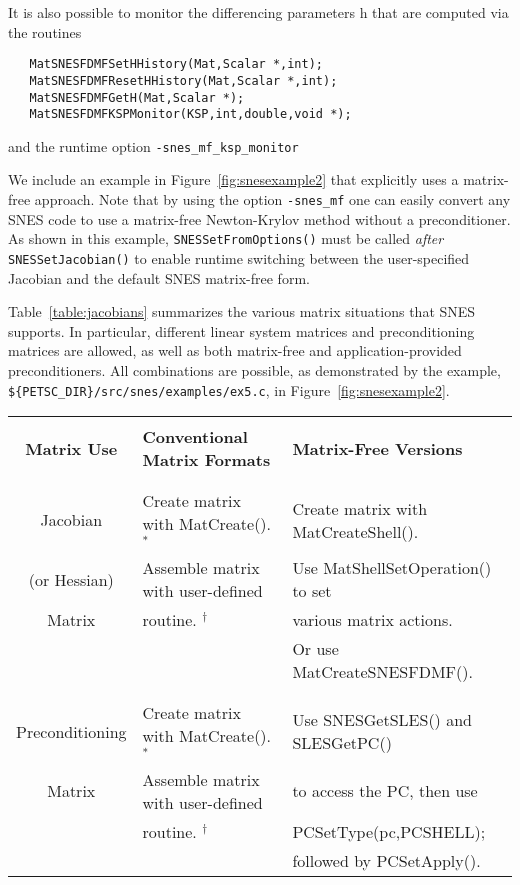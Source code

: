 It is also possible to monitor the differencing parameters h that are computed
via the routines
\begin{verbatim}
   MatSNESFDMFSetHHistory(Mat,Scalar *,int);
   MatSNESFDMFResetHHistory(Mat,Scalar *,int);
   MatSNESFDMFGetH(Mat,Scalar *);
   MatSNESFDMFKSPMonitor(KSP,int,double,void *);
\end{verbatim}
and the runtime option  {\tt -snes\_mf\_ksp\_monitor} {

We include an example in Figure~\ref{fig:snesexample2} that explicitly
uses a matrix-free approach.  Note that by using the option 
{\tt -snes\_mf} one can easily convert any SNES code to use a matrix-free
Newton-Krylov method without a preconditioner.  As shown in this
example, {\tt SNESSetFromOptions()} must be called {\em after}
{\tt SNESSetJacobian()} to enable runtime switching between the
user-specified Jacobian and the default SNES matrix-free form.

Table~\ref{table:jacobians} summarizes the various matrix situations
that SNES supports.  In particular, different linear system matrices
and preconditioning matrices are allowed, as well as both matrix-free
and application-provided preconditioners.  All combinations are
possible, as demonstrated by the example, 
{\tt \$\{PETSC\_DIR\}/src/snes/\-examples/ex5.c},
 in Figure~\ref{fig:snesexample2}.

\begin{center}
\begin{table}[H]
\begin{tabular}{|c|l|l|} \hline
& & \\
{\bf Matrix Use}      & {\bf Conventional Matrix Formats}          & {\bf Matrix-Free Versions}\\ 
& & \\ \hline
& & \\
Jacobian        & Create matrix with MatCreate(). $ ^* $ & Create matrix with MatCreateShell().\\
(or Hessian)    & Assemble matrix with user-defined     & Use MatShellSetOperation() to set\\
Matrix          & routine. $ ^\dagger $                         & various matrix actions.\\
                &                                    & Or use MatCreateSNESFDMF().\\
& & \\ \hline
& & \\
Preconditioning  & Create matrix with MatCreate(). $ ^* $ & Use SNESGetSLES() and SLESGetPC() \\
Matrix           & Assemble matrix with user-defined & to access the PC, then use\\
                & routine. $ ^\dagger $         & PCSetType(pc,PCSHELL);\\ 
                &             & followed by PCSetApply(). \\


\end{tabular}
\end{table}
\end{center}}
